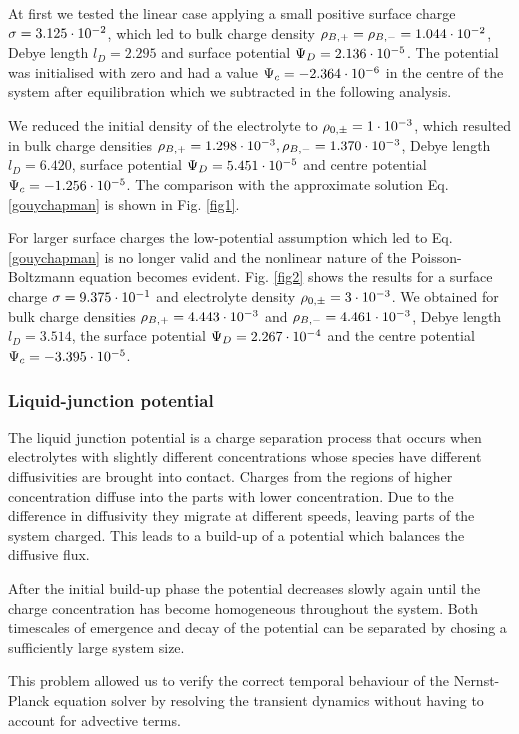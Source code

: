 At first we tested the linear case applying a small positive surface charge
$\sigma=3.125\cdot10^{-2}$, which led to bulk charge density $\rho_{B,+}=\rho_{B,-}=1.044\cdot10^{-2}$, 
Debye length $l_D=2.295$ and surface potential $\Psi_D=2.136\cdot10^{-5}$.
The potential was initialised with zero and had a value $\Psi_c=-2.364\cdot10^{-6}$ 
in the centre of the system after equilibration which we subtracted in the 
following analysis.

We reduced the initial density of the electrolyte to $\rho_{0,\pm}=1\cdot10^{-3}$,
which resulted in bulk charge densities  
$\rho_{B,+}=1.298\cdot10^{-3}, \rho_{B,-}=1.370\cdot10^{-3}$, 
Debye length $l_D=6.420$, surface potential $\Psi_D=5.451\cdot10^{-5}$
and centre potential $\Psi_c=-1.256\cdot10^{-5}$.
The comparison with the approximate solution Eq. \ref{gouychapman} is shown 
in Fig. \ref{fig1}.

For larger surface charges the low-potential assumption which led to Eq. \ref{gouychapman}
is no longer valid and the nonlinear nature of the Poisson-Boltzmann 
equation becomes evident.
Fig. \ref{fig2} shows the results for a surface charge $\sigma=9.375\cdot10^{-1}$
and electrolyte density $\rho_{0,\pm}=3\cdot10^{-3}$. We obtained for   
bulk charge densities $\rho_{B,+}=4.443\cdot10^{-3}$ and $\rho_{B,-}=4.461\cdot10^{-3}$, 
Debye length $l_D=3.514$, the surface potential $\Psi_D=2.267\cdot10^{-4}$
and the centre potential $\Psi_c=-3.395\cdot10^{-5}$. 

\subsubsection{Liquid-junction potential}

The liquid junction potential 
is a charge separation process that 
occurs when electrolytes with slightly different concentrations
whose species have different diffusivities are brought into contact.
Charges from the regions of higher concentration diffuse   
into the parts with lower concentration. Due to the difference 
in diffusivity they migrate at different speeds, leaving parts of
the system charged. This leads to a build-up of a potential
which balances the diffusive flux.

After the initial build-up phase the potential decreases slowly 
again until the charge concentration has become homogeneous throughout 
the system. Both timescales of emergence and decay of the potential
can be separated by chosing a sufficiently large system size.

This problem allowed us to verify the correct temporal 
behaviour of the Nernst-Planck equation solver by resolving the transient 
dynamics without having to account for advective terms.

